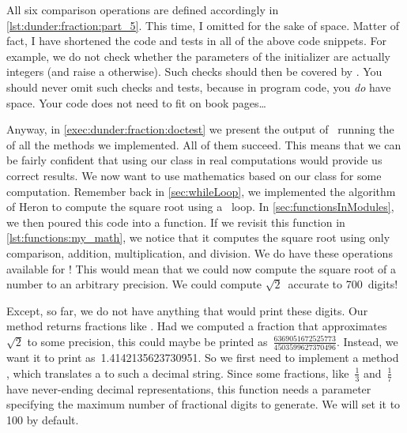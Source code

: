 All six comparison operations are defined accordingly in \cref{lst:dunder:fraction:part_5}.
This time, I omitted  for the sake of space.
Matter of fact, I have shortened the code and tests in all of the above code snippets.
For example, we do not check whether the parameters of the initializer  are actually integers (and raise a  otherwise).
Such checks should then be covered by .
You should never omit such checks and tests, because in program code, you \emph{do} have space.
Your code does not need to fit on book pages\dots

Anyway, in \cref{exec:dunder:fraction:doctest} we present the output of \pytest\ running the  of all the methods we implemented.
All of them succeed.
This means that we can be fairly confident that using our  class in real computations would provide us correct results.%
\FloatBarrier%
\endhsection%
%
%
\label{sec:dunder:debugging}%
%
We now want to use mathematics based on our class  for some  computation.
Remember back in \cref{sec:whileLoop}, we implemented the algorithm of Heron to compute the square root using a ~loop.
In \cref{sec:functionsInModules}, we then poured this code into a function.
If we revisit this function  in \cref{lst:functions:my_math}, we notice that it computes the square root using only comparison, addition, multiplication, and division.
We do have these operations available for !
This would mean that we could now compute the square root of a number to an arbitrary precision.
We could compute $\sqrt{2}$~accurate to 700~digits!

Except, so far, we do not have anything that would print these digits.
Our  method returns fractions like .
Had we computed a fraction that approximates~$\sqrt{2}$ to some precision, this could maybe be printed as~$\frac{6369051672525773}{4503599627370496}$.
Instead, we want it to print as~1.4142135623730951.
So we first need to implement a method , which translates a  to such a decimal string.
Since some fractions, like~$\frac{1}{3}$ and~$\frac{1}{7}$ have never-ending decimal representations, this function needs a parameter  specifying the maximum number of fractional digits to generate.
We will set it to 100 by default.

%

